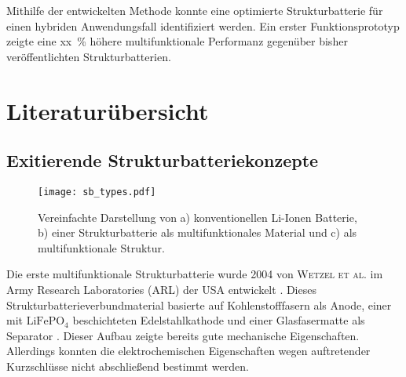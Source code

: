Mithilfe der entwickelten Methode konnte eine optimierte Struktur­batterie für einen hybriden Anwendungsfall identifiziert werden. Ein erster Funktionsprototyp zeigte eine xx~\% höhere multifunktionale Performanz gegenüber bisher veröffentlichten Struktur­batterien.



\section{\label{sec:Literaturübersicht}Literaturübersicht}

\subsection{Exitierende Strukturbatteriekonzepte}

\begin{figure}[h]
        \center
	\texttt{[image: sb\_types.pdf]}
		\caption{\label{fig:sb_types}Vereinfachte Darstellung von a) konventionellen Li-Ionen Batterie, b) einer Strukturbatterie als multifunktionales Material und c) als multifunktionale Struktur.}
\end{figure}

Die erste multifunktionale Strukturbatterie wurde 2004 von \textsc{Wetzel et al.} im Army Research Laboratories (ARL) der USA entwickelt \cite{Wetzel2004, Snyder2006, Wong2007, Snyder2007}. Dieses Strukturbatterieverbundmaterial basierte auf Kohlenstofffasern als Anode, einer mit $\text{LiFePO}_\text{4}$ beschichteten Edelstahlkathode und einer Glasfasermatte als Separator \cite{Wong2007}. Dieser Aufbau zeigte bereits gute mechanische Eigenschaften. Allerdings konnten die elektrochemischen Eigenschaften wegen auftretender Kurzschlüsse nicht abschließend bestimmt werden.

